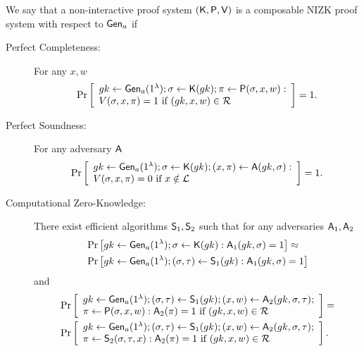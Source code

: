 \begin{definition} We say that a non-interactive proof system $(\mathsf{K},\mathsf{P},\mathsf{V})$ is a composable NIZK proof system with respect to $\mathsf{Gen}_a$ if
\begin{description}
\item[Perfect Completeness:] For any $x,w$
$$
\Pr\left[
\begin{array}{l}
gk\gets\mathsf{Gen}_a(1^\lambda);\sigma\gets\mathsf{K}(gk);\pi\gets\mathsf{P}(\sigma,x,w):\\
V(\sigma,x,\pi)=1 \text{ if } (gk,x,w)\in\mathcal{R}
\end{array}
\right]=1.
$$
\item[Perfect Soundness:] For any adversary $\mathsf{A}$
$$
\Pr\left[
\begin{array}{l}
gk\gets\mathsf{Gen}_a(1^\lambda);\sigma\gets\mathsf{K}(gk);(x,\pi)\gets\mathsf{A}(gk,\sigma):\\
V(\sigma,x,\pi)=0 \text{ if } x\notin\mathcal{L}
\end{array}
\right]=1.
$$
\item[Computational Zero-Knowledge:] There exist efficient algorithms $\mathsf{S}_1,\mathsf{S}_2$ such that for any adversaries $\mathsf{A}_1,\mathsf{A}_2$
\begin{align*}
&\Pr\left[
gk\gets\mathsf{Gen}_a(1^\lambda);\sigma\gets\mathsf{K}(gk):
\mathsf{A}_1(gk,\sigma)=1
\right]\approx\\
&\Pr\left[
gk\gets\mathsf{Gen}_a(1^\lambda);(\sigma,\tau)\gets\mathsf{S}_1(gk):
\mathsf{A}_1(gk,\sigma)=1
\right]
\end{align*}
and
\begin{align*}
&\Pr\left[
\begin{array}{l}
gk\gets\mathsf{Gen}_a(1^\lambda);(\sigma,\tau)\gets\mathsf{S}_1(gk);(x,w)\gets\mathsf{A}_2(gk,\sigma,\tau);\\
\pi\gets\mathsf{P}(\sigma,x,w):\mathsf{A}_2(\pi)=1\text{ if }(gk,x,w)\in\mathcal{R}
\end{array}
\right]=\\
&\Pr\left[
\begin{array}{l}
gk\gets\mathsf{Gen}_a(1^\lambda);(\sigma,\tau)\gets\mathsf{S}_1(gk);(x,w)\gets\mathsf{A}_2(gk,\sigma,\tau);\\
\pi\gets\mathsf{S}_2(\sigma,\tau,x):\mathsf{A}_2(\pi)=1\text{ if }(gk,x,w)\in\mathcal{R}
\end{array}
\right].
\end{align*}
\end{description}
\end{definition}

